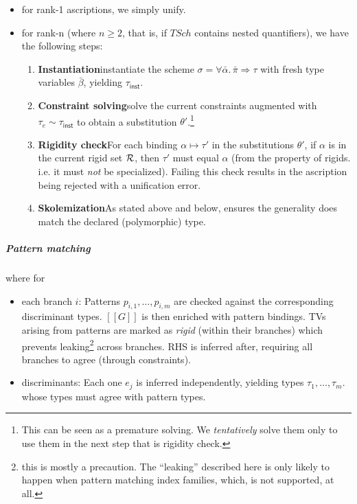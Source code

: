 \documentclass[a4paper, 11pt]{article}
\theoremstyle{remark}\newtheorem*{remark}{Remark}
\theoremstyle{definition}\newtheorem*{definition}{Definition}
\begin{document}
\begin{itemize}
\item for rank-1 ascriptions, we simply unify.
\item for rank-n (where \(n\ge 2\), that is, if \(TSch\) contains nested quantifiers), we have the
  following steps:
  \begin{enumerate}
    \item \textbf{Instantiation}\quad instantiate the scheme \(\sigma = \forall \bar{\alpha}.\, \bar{\pi} \Rightarrow \tau\)
      with fresh type variables \(\bar{\beta}\), yielding \(\tau_{\mathsf{inst}}\).
    \item \textbf{Constraint solving}\quad solve the current constraints
      augmented with \(\tau_e \sim \tau_{\mathsf{inst}}\) to obtain
      a substitution \(\theta'\).\footnote{
        This can be seen as a premature solving. We \emph{tentatively} solve them only to
        use them in the next step that is rigidity check.
      }
    \item \textbf{Rigidity check}\quad For each binding \(\alpha \mapsto \tau'\) in the
      substitutions \(\theta'\), if \(\alpha\) is in the current rigid set \(\mathcal{R}\), then \(\tau'\) must
      equal \(\alpha\) (from the property of rigids. i.e. it must \emph{not} be specialized).
      Failing this check results in the ascription being rejected with a unification error.
    \item \textbf{Skolemization}\quad As stated above and below, ensures the generality does
      match the declared (polymorphic) type.
  \end{enumerate}
\end{itemize}
\subparagraph*{Pattern matching} where for
\begin{itemize}
\item each branch \(i\): Patterns \(p_{i,1}, \ldots, p_{i,m}\)
  are checked against the corresponding discriminant types.
  \([[G]]\) is then enriched with pattern bindings. TVs arising from patterns are
  marked as \emph{rigid} (within their branches)
  which prevents leaking\footnote{
    this is mostly a precaution. The ``leaking'' described here is only likely
    to happen when pattern matching index families, which, is not supported, at all.
  }
  across branches.
  RHS is inferred after, requiring
  all branches to agree (through constraints).
\item discriminants: Each one \(e_j\) is inferred independently,
  yielding types \(\tau_1, \ldots, \tau_m\). whose types must agree with pattern types.
\end{itemize}
\end{document}
